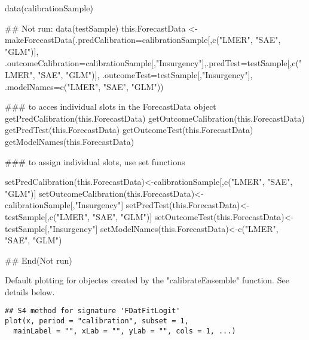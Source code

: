 \documentclass[a4paper]{book}
\begin{document}
\begin{Examples}
\begin{ExampleCode}
data(calibrationSample)

## Not run: data(testSample)
this.ForecastData <- makeForecastData(.predCalibration=calibrationSample[,c("LMER", "SAE", "GLM")],
.outcomeCalibration=calibrationSample[,"Insurgency"],.predTest=testSample[,c("LMER", "SAE", "GLM")],
.outcomeTest=testSample[,"Insurgency"], .modelNames=c("LMER", "SAE", "GLM"))

### to acces individual slots in the ForecastData object
getPredCalibration(this.ForecastData)
getOutcomeCalibration(this.ForecastData)
getPredTest(this.ForecastData)
getOutcomeTest(this.ForecastData)
getModelNames(this.ForecastData)

### to assign individual slots, use set functions

setPredCalibration(this.ForecastData)<-calibrationSample[,c("LMER", "SAE", "GLM")]
setOutcomeCalibration(this.ForecastData)<-calibrationSample[,"Insurgency"]
setPredTest(this.ForecastData)<-testSample[,c("LMER", "SAE", "GLM")]
setOutcomeTest(this.ForecastData)<-testSample[,"Insurgency"]
setModelNames(this.ForecastData)<-c("LMER", "SAE", "GLM")

## End(Not run)
\end{ExampleCode}
\end{Examples}
%
\begin{Description}\relax
Default plotting for objectes created by the "calibrateEnsemble" function.  See details below.
\end{Description}
%
\begin{Usage}
\begin{verbatim}
## S4 method for signature 'FDatFitLogit'
plot(x, period = "calibration", subset = 1,
  mainLabel = "", xLab = "", yLab = "", cols = 1, ...)
\end{verbatim}
\end{Usage}
%
\end{document}

